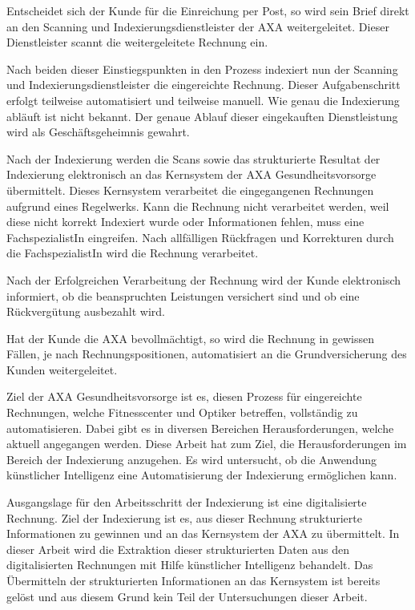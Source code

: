 Entscheidet sich der Kunde für die Einreichung per Post, so wird sein Brief direkt an den Scanning und Indexierungsdienstleister der AXA weitergeleitet. Dieser Dienstleister scannt die weitergeleitete Rechnung ein.

Nach beiden dieser Einstiegspunkten in den Prozess indexiert nun der Scanning und Indexierungsdienstleister die eingereichte Rechnung. Dieser Aufgabenschritt erfolgt teilweise automatisiert und teilweise manuell. Wie genau die Indexierung abläuft ist nicht bekannt. Der genaue Ablauf dieser eingekauften Dienstleistung wird als Geschäftsgeheimnis gewahrt.

Nach der Indexierung werden die Scans sowie das strukturierte Resultat der Indexierung elektronisch an das Kernsystem der AXA Gesundheitsvorsorge übermittelt. Dieses Kern\-system verarbeitet die eingegangenen Rechnungen aufgrund eines Regelwerks. Kann die Rechnung nicht verarbeitet werden, weil diese nicht korrekt Indexiert wurde oder Informationen fehlen, muss eine FachspezialistIn eingreifen. Nach allfälligen Rückfragen und Korrekturen durch die FachspezialistIn wird die Rechnung verarbeitet. 

Nach der Erfolgreichen Verarbeitung der Rechnung wird der Kunde elektronisch informiert, ob die beanspruchten Leistungen versichert sind und ob eine Rückvergütung ausbezahlt wird.

Hat der Kunde die AXA bevollmächtigt, so wird die Rechnung in gewissen Fällen, je nach Rechnungspositionen, automatisiert an die Grundversicherung des Kunden weitergeleitet.

Ziel der AXA Gesundheitsvorsorge ist es, diesen Prozess für eingereichte Rechnungen, welche Fitnesscenter und Optiker betreffen, vollständig zu automatisieren. Dabei gibt es in diversen Bereichen Herausforderungen, welche aktuell angegangen werden. Diese Arbeit hat zum Ziel, die Herausforderungen im Bereich der Indexierung anzugehen. Es wird untersucht, ob die Anwendung künstlicher Intelligenz eine Automatisierung der Indexierung ermöglichen kann.

Ausgangslage für den Arbeitsschritt der Indexierung ist eine digitalisierte Rechnung. Ziel der Indexierung ist es, aus dieser Rechnung strukturierte Informationen zu gewinnen und an das Kernsystem der AXA zu übermittelt. In dieser Arbeit wird die Extraktion dieser strukturierten Daten aus den digitalisierten Rechnungen mit Hilfe künstlicher Intelligenz behandelt. Das Übermitteln der strukturierten Informationen an das Kernsystem ist bereits gelöst und aus diesem Grund kein Teil der Untersuchungen dieser Arbeit.

